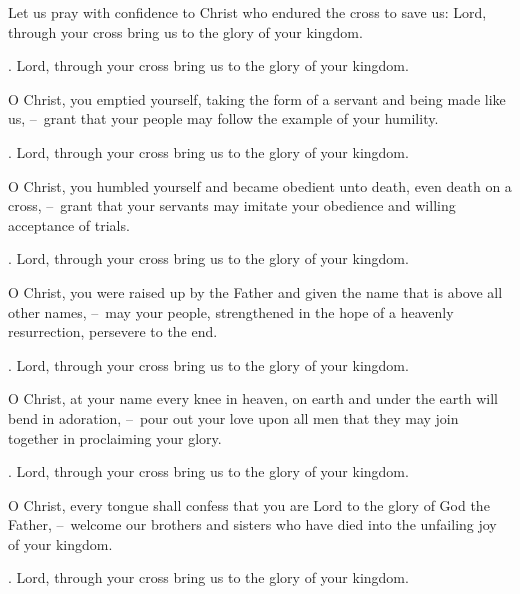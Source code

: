 \lettrine[lines=2]{L}{}et us pray with confidence to Christ who endured the cross to save us: Lord, through your cross bring us to the glory of your kingdom.
\par \Rbar. Lord, through your cross bring us to the glory of your kingdom.

O Christ, you emptied yourself, taking the form of a servant and being made like us,
– grant that your people may follow the example of your humility.
\par \Rbar. Lord, through your cross bring us to the glory of your kingdom.

O Christ, you humbled yourself and became obedient unto death, even death on a cross,
– grant that your servants may imitate your obedience and willing acceptance of trials.
\par \Rbar. Lord, through your cross bring us to the glory of your kingdom.

O Christ, you were raised up by the Father and given the name that is above all other names,
– may your people, strengthened in the hope of a heavenly resurrection, persevere to the end.
\par \Rbar. Lord, through your cross bring us to the glory of your kingdom.

O Christ, at your name every knee in heaven, on earth and under the earth will bend in adoration,
– pour out your love upon all men that they may join together in proclaiming your glory.
\par \Rbar. Lord, through your cross bring us to the glory of your kingdom.

O Christ, every tongue shall confess that you are Lord to the glory of God the Father,
– welcome our brothers and sisters who have died into the unfailing joy of your kingdom.
\par \Rbar. Lord, through your cross bring us to the glory of your kingdom.
